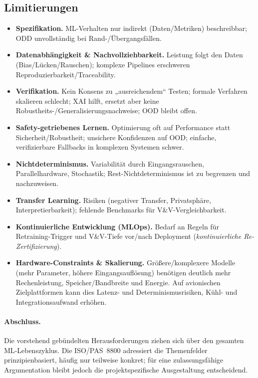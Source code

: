 \subsection{Limitierungen}
\begin{itemize}
  \item \textbf{Spezifikation.}
        ML-Verhalten nur indirekt (Daten/Metriken) beschreibbar; ODD unvollständig bei Rand-/Übergangsfällen.
  \item \textbf{Datenabhängigkeit \& Nachvollziehbarkeit.}
        Leistung folgt den Daten (Bias/Lücken/Rauschen); komplexe Pipelines erschweren Reproduzierbarkeit/Traceability.
  \item \textbf{Verifikation.}
        Kein Konsens zu „ausreichendem“ Testen; formale Verfahren skalieren schlecht; XAI hilft, ersetzt aber keine Robustheits-/Generalisierungsnachweise; OOD bleibt offen.
  \item \textbf{Safety-getriebenes Lernen.}
        Optimierung oft auf Performance statt Sicherheit/Robustheit; unsichere Konfidenzen auf OOD; einfache, verifizierbare Fallbacks in komplexen Systemen schwer.
  \item \textbf{Nichtdeterminismus.}
        Variabilität durch Eingangsrauschen, Parallelhardware, Stochastik; Rest-Nichtdeterminismus ist zu begrenzen und nachzuweisen.
  \item \textbf{Transfer Learning.}
        Risiken (negativer Transfer, Privatsphäre, Interpretierbarkeit); fehlende Benchmarks für V\&V-Vergleichbarkeit.
  \item \textbf{Kontinuierliche Entwicklung (MLOps).}
        Bedarf an Regeln für Retraining-Trigger und V\&V-Tiefe vor/nach Deployment (\emph{kontinuierliche Re-Zertifizierung}).
  \item \textbf{Hardware-Constraints \& Skalierung.} 
        Größere/komplexere Modelle (mehr Parameter, höhere Eingangsauflösung) benötigen deutlich mehr Rechenleistung, Speicher/Bandbreite und Energie. Auf avionischen Zielplattformen kann dies Latenz- und Determinismusrisiken, Kühl- und Integrationsaufwand erhöhen.

\end{itemize}

\paragraph{Abschluss.}
Die vorstehend gebündelten Herausforderungen ziehen sich über den gesamten ML‐Lebenszyklus. 
Die ISO/PAS~8800 adressiert die Themenfelder prinzipienbasiert, häufig nur teilweise konkret; 
für eine zulassungsfähige Argumentation bleibt jedoch die projektspezifische Ausgestaltung entscheidend.




